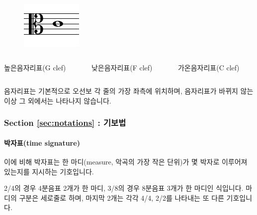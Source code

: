 \documentclass{beamer}
\begin{document}
\begin{frame}
\begin{columns}
\begin{column}{0.3\textwidth}
				\centering
				\noindent
				\begin{figure}[h!]
					\includegraphics[width=0.7\columnwidth]{res/pdf/4/clef/c_clef.pdf}
				\end{figure}
			\end{column}
		\end{columns}
		\begin{columns}
			\begin{column}{0.3\textwidth}
				\centering
				\small 높은음자리표(G clef)
			\end{column}
			\begin{column}{0.3\textwidth}
				\centering
				\small 낮은음자리표(F clef)
			\end{column}
			\begin{column}{0.3\textwidth}
				\centering
				\small 가온음자리표(C clef)
			\end{column}
		\end{columns}
		음자리표는 기본적으로 오선보 각 줄의 가장 좌측에 위치하며, 음자리표가 바뀌지 않는 이상 그 외에서는 나타나지 않습니다.
	\end{frame}
	
	\begin{frame}
		\frametitle{Section \ref{sec:notations} : 기보법}
		\framesubtitle{박자표(time signature)}
		이에 비해 박자표는 한 마디(measure, 악곡의 가장 작은 단위)가 몇 박자로 이루어져 있는지를 지시하는 기호입니다.
		\begin{figure}[!h]
		\end{figure}
		2/4의 경우 4분음표 2개가 한 마디, 3/8의 경우 8분음표 3개가 한 마디인 식입니다. 마디의 구분은 세로줄로 하며, 마지막 2개는 각각 4/4, 2/2를 나타내는 또 다른 기호입니다.
	\end{frame}
	
\end{document}
